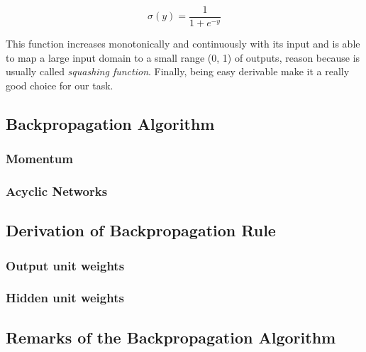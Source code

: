 \documentclass{article}
\begin{document}
	\begin{equation}
		\label{sigmoid_function}
		\sigma(y) = \frac{1}{1+e^{-y}}
	\end{equation}

This function increases monotonically and continuously with its input and is able to map a large input domain to a small range (0, 1) of outputs, reason because is usually called \textit{squashing function}. Finally, being easy derivable make it a really good choice for our task. 


\subsection{Backpropagation Algorithm}
\subsubsection{Momentum}
\subsubsection{Acyclic Networks}
\subsection{Derivation of Backpropagation Rule}
\subsubsection{Output unit weights}
\subsubsection{Hidden unit weights}
\subsection{Remarks of the Backpropagation Algorithm}
\end{document}
